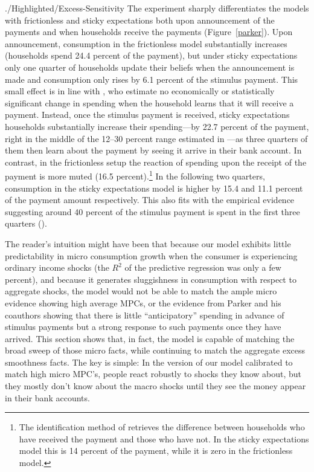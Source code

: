 \documentclass[titlepage]{./econtex}
\begin{document}
\begin{verbatimwrite}{./Highlighted/Excess-Sensitivity}
The experiment sharply differentiates the models with frictionless and sticky expectations both upon announcement of the payments and when households receive the payments (Figure~\ref{parker}). Upon announcement, consumption in the frictionless model substantially increases (households spend 24.4 percent of the payment), but under sticky expectations only one quarter of households update their beliefs when the announcement is made and consumption only rises by 6.1 percent of the stimulus payment.  This small effect is in line with \cite{brodaParker}, who estimate no economically or statistically significant change in spending when the household learns that it will receive a payment.  Instead, once the stimulus payment is received, sticky expectations households substantially increase their spending---by 22.7 percent of the payment, right in the middle of the 12--30 percent range estimated in \cite{psjmMPC2008}---as three quarters of them then learn about the payment by seeing it arrive in their bank account. In contrast, in the frictionless setup the reaction of spending upon the receipt of the payment is more muted (16.5 percent).\footnote{The identification method of \cite{psjmMPC2008} retrieves the difference between households who have received the payment and those who have not. In the sticky expectations model this is 14 percent of the payment, while it is zero in the frictionless model.} In the following two quarters, consumption in the sticky expectations model is higher by 15.4 and 11.1 percent of the payment amount respectively. This also fits with the empirical evidence suggesting around 40 percent of the stimulus payment is spent in the first three quarters (\cite{psjmMPC2008}).

The reader's intuition might have been that because our model exhibits little predictability in micro consumption growth when the consumer is experiencing ordinary income shocks (the $R^{2}$ of the predictive regression was only a few percent), and because it generates sluggishness in consumption with respect to aggregate shocks, the model would not be able to match the ample micro evidence showing high average MPCs, or the evidence from Parker and his coauthors showing that there is little ``anticipatory'' spending in advance of stimulus payments but a strong response to such payments once they have arrived.  This section shows that, in fact, the model is capable of matching the broad sweep of those micro facts, while continuing to match the aggregate excess smoothness facts.  The key is simple: In the version of our model calibrated to match high micro MPC's, people react robustly to shocks they know about, but they mostly don't know about the macro shocks until they see the money appear in their bank accounts.

\end{verbatimwrite}
\end{document}
